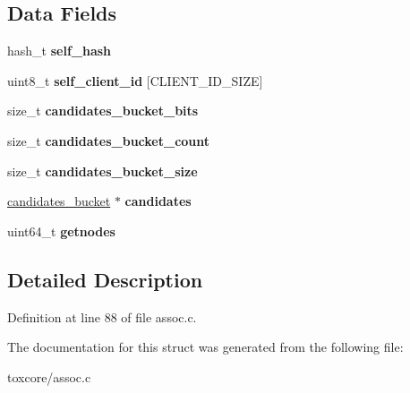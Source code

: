 \subsection*{Data Fields}
\begin{DoxyCompactItemize}
\item 
\hypertarget{struct_assoc_a6531d0c8e69576ae8c58a02914abaefe}{hash\+\_\+t {\bfseries self\+\_\+hash}}\label{struct_assoc_a6531d0c8e69576ae8c58a02914abaefe}

\item 
\hypertarget{struct_assoc_a509ad2eff925992e4ad8739d6fe2d7bb}{uint8\+\_\+t {\bfseries self\+\_\+client\+\_\+id} \mbox{[}C\+L\+I\+E\+N\+T\+\_\+\+I\+D\+\_\+\+S\+I\+Z\+E\mbox{]}}\label{struct_assoc_a509ad2eff925992e4ad8739d6fe2d7bb}

\item 
\hypertarget{struct_assoc_ab4153986e9b7dd71547967436299a424}{size\+\_\+t {\bfseries candidates\+\_\+bucket\+\_\+bits}}\label{struct_assoc_ab4153986e9b7dd71547967436299a424}

\item 
\hypertarget{struct_assoc_a22dd0674eae131fab27462b931d4397c}{size\+\_\+t {\bfseries candidates\+\_\+bucket\+\_\+count}}\label{struct_assoc_a22dd0674eae131fab27462b931d4397c}

\item 
\hypertarget{struct_assoc_a9349f5b3095733f74b3704aa9766a05a}{size\+\_\+t {\bfseries candidates\+\_\+bucket\+\_\+size}}\label{struct_assoc_a9349f5b3095733f74b3704aa9766a05a}

\item 
\hypertarget{struct_assoc_a9d492ea4282a0aca2bcb32d987f58175}{\hyperlink{structcandidates__bucket}{candidates\+\_\+bucket} $\ast$ {\bfseries candidates}}\label{struct_assoc_a9d492ea4282a0aca2bcb32d987f58175}

\item 
\hypertarget{struct_assoc_aec732782691c39a31d8c579a79a8fed2}{uint64\+\_\+t {\bfseries getnodes}}\label{struct_assoc_aec732782691c39a31d8c579a79a8fed2}

\end{DoxyCompactItemize}


\subsection{Detailed Description}


Definition at line 88 of file assoc.\+c.



The documentation for this struct was generated from the following file\+:\begin{DoxyCompactItemize}
\item 
toxcore/assoc.\+c\end{DoxyCompactItemize}
